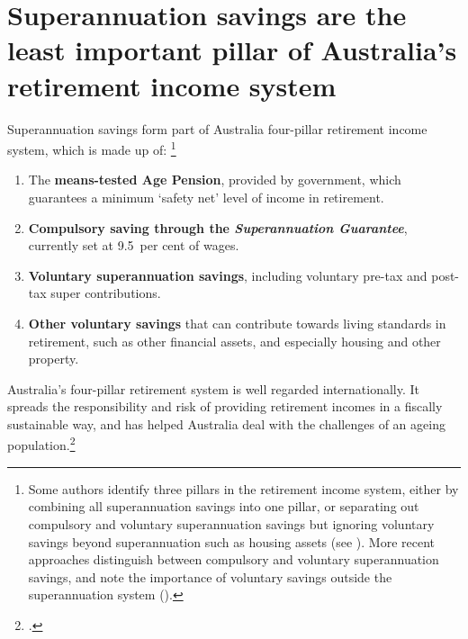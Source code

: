 \section{Superannuation savings are the least important pillar of Australia's retirement income system}\label{sec:SUPER-Super-savings-are-least-important-pillar}\label{sec:SUPER-2-1}
Superannuation savings form part of Australia four-pillar retirement income system, which is made up of:%
\footnote{%
Some authors identify three pillars in the retirement income system, either by combining all superannuation savings into one pillar, or separating out compulsory and voluntary superannuation savings but ignoring voluntary savings beyond superannuation such as housing assets (see \textcite[][9]{Treasury2009aftsRetirementIncomeStrategicIssues}). More recent approaches distinguish between compulsory and voluntary superannuation savings, and note the importance of voluntary savings outside the superannuation system (\textcite[][17]{Derby2015}). 
}%
\mynobreakpar
\begin{enumerate}
\item The \textbf{means-tested Age Pension}, provided by government, which guarantees a minimum `safety net' level of income in retirement.
\item \textbf{Compulsory saving through the \emph{Superannuation Guarantee}}, currently set at 9.5~per cent of wages.
\item \textbf{Voluntary superannuation savings}, including voluntary pre-tax and post-tax super contributions.
\item \textbf{Other voluntary savings} that can contribute towards living standards in retirement, such as other financial assets, and especially housing and other property.
\end{enumerate}

Australia’s four-pillar retirement system is well regarded internationally. It spreads the responsibility and risk of providing retirement incomes in a fiscally sustainable way, and has helped Australia deal with the challenges of an ageing population.\footcite{Mercer2015} 

